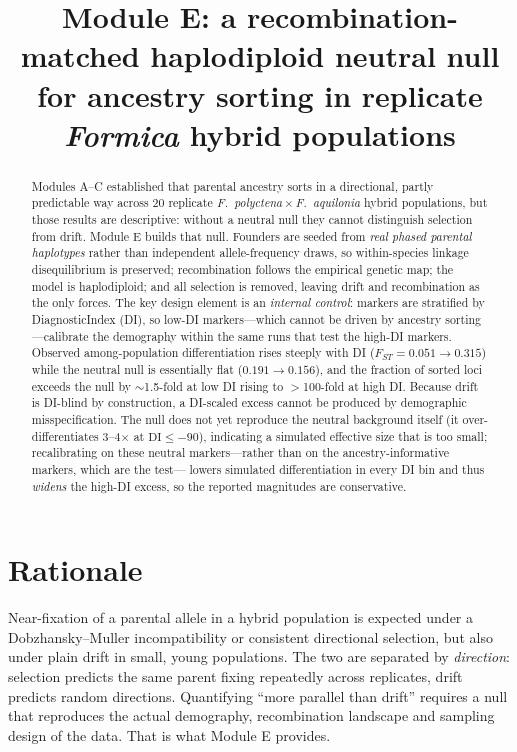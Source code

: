 \documentclass[11pt,a4paper]{article}
\title{Module E: a recombination-matched haplodiploid neutral null for
ancestry sorting in replicate \textit{Formica} hybrid populations}
\author{}
\date{}
\begin{document}
\maketitle
\vspace{-2.2em}

\begin{abstract}
\noindent
Modules A--C established that parental ancestry sorts in a directional,
partly predictable way across 20 replicate \textit{F.\ polyctena}\,$\times$\,\textit{F.\
aquilonia} hybrid populations, but those results are descriptive: without a
neutral null they cannot distinguish selection from drift. Module E builds that
null. Founders are seeded from \emph{real phased parental haplotypes} rather than
independent allele-frequency draws, so within-species linkage disequilibrium is
preserved; recombination follows the empirical genetic map; the model is
haplodiploid; and all selection is removed, leaving drift and recombination as
the only forces. The key design element is an \emph{internal control}: markers are
stratified by DiagnosticIndex (DI), so low-DI markers---which cannot be driven by
ancestry sorting---calibrate the demography within the same runs that test the
high-DI markers. Observed among-population differentiation rises steeply with DI
($F_{ST}=0.051\rightarrow0.315$) while the neutral null is essentially flat
($0.191\rightarrow0.156$), and the fraction of sorted loci exceeds the null by
$\sim$1.5-fold at low DI rising to $>$100-fold at high DI. Because drift is
DI-blind by construction, a DI-scaled excess cannot be produced by demographic
misspecification. The null does not yet reproduce the neutral background itself
(it over-differentiates 3--4$\times$ at $\mathrm{DI}\le-90$), indicating a
simulated effective size that is too small; recalibrating on these neutral
markers---rather than on the ancestry-informative markers, which are the test---
lowers simulated differentiation in every DI bin and thus \emph{widens} the
high-DI excess, so the reported magnitudes are conservative.
\end{abstract}

\section{Rationale}

Near-fixation of a parental allele in a hybrid population is expected under a
Dobzhansky--Muller incompatibility or consistent directional selection, but also
under plain drift in small, young populations. The two are separated by
\emph{direction}: selection predicts the same parent fixing repeatedly across
replicates, drift predicts random directions. Quantifying ``more parallel than
drift'' requires a null that reproduces the actual demography, recombination
landscape and sampling design of the data. That is what Module E provides.
\end{document}
